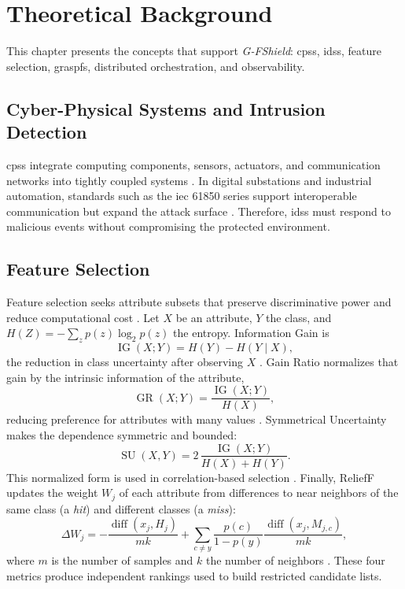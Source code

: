 \chapter{Theoretical Background}
\label{chapter:fundamentacao}

This chapter presents the concepts that support \textit{G-FShield}: \acp{cps}, \acp{ids}, feature selection, \ac{graspfs}, distributed orchestration, and observability.

\section{Cyber-Physical Systems and Intrusion Detection}

\acp{cps} integrate computing components, sensors, actuators, and communication networks into tightly coupled systems \cite{Cardenas2009,Mitchell2014}. In digital substations and industrial automation, standards such as the \ac{iec} 61850 series support interoperable communication but expand the attack surface \cite{iec61850,mackiewicz2006overview,aftab2020iec}. Therefore, \acp{ids} must respond to malicious events without compromising the protected environment.

\section{Feature Selection}

Feature selection seeks attribute subsets that preserve discriminative power and reduce computational cost \cite{Hall1999,Saeys2007,guyon2003introduction}. Let $X$ be an attribute, $Y$ the class, and $H(Z)=-\sum_z p(z)\log_2p(z)$ the entropy. Information Gain is
\begin{equation}
  \operatorname{IG}(X;Y)=H(Y)-H(Y\mid X),
\end{equation}
the reduction in class uncertainty after observing $X$ \cite{Quinlan1986InformationGain}. Gain Ratio normalizes that gain by the intrinsic information of the attribute,
\begin{equation}
  \operatorname{GR}(X;Y)=\frac{\operatorname{IG}(X;Y)}{H(X)},
\end{equation}
reducing preference for attributes with many values \cite{Quinlan1993C45}. Symmetrical Uncertainty makes the dependence symmetric and bounded:
\begin{equation}
  \operatorname{SU}(X,Y)=2\,\frac{\operatorname{IG}(X;Y)}{H(X)+H(Y)}.
\end{equation}
This normalized form is used in correlation-based selection \cite{Hall1999}.
Finally, ReliefF updates the weight $W_j$ of each attribute from differences to near neighbors of the same class (a \textit{hit}) and different classes (a \textit{miss}):
\begin{equation}
 \Delta W_j=-\frac{\operatorname{diff}(x_j,H_j)}{mk}+\sum_{c\neq y}\frac{p(c)}{1-p(y)}\frac{\operatorname{diff}(x_j,M_{j,c})}{mk},
\end{equation}
where $m$ is the number of samples and $k$ the number of neighbors \cite{kononenko1994estimating,robnik2003theoretical}. These four metrics produce independent rankings used to build restricted candidate lists.

